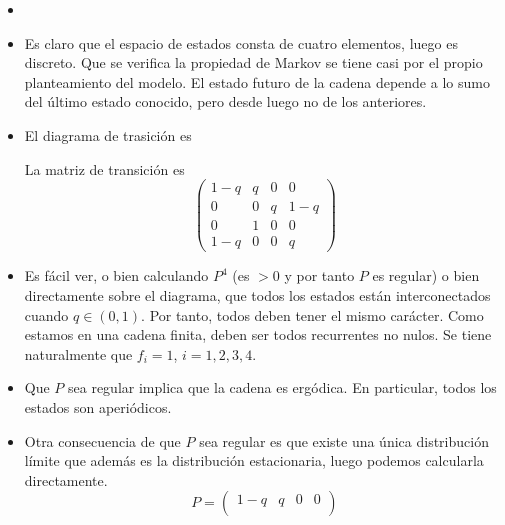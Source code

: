 \documentclass[twoside]{article}
\begin{document}
\begin{solucion}

\begin{itemize}
\item[]
\item Es claro que el espacio de estados consta de cuatro elementos, luego es discreto. Que se verifica la propiedad de Markov se tiene casi por el propio planteamiento del modelo. El estado futuro de la cadena depende a lo sumo del último estado conocido, pero desde luego no de los anteriores. 
\item El diagrama de trasición es

\begin{center}
\end{center}
La matriz de transición es
$$
\begin{pmatrix}
1-q	& q & 0 & 0\\
0 	& 0	& q	& 1-q\\
0	& 1 & 0 & 0\\
1-q & 0 & 0 & q
\end{pmatrix}
$$
\item Es fácil ver, o bien calculando $P^4$ (es $>0$ y por tanto $P$ es regular) o bien directamente sobre el diagrama, que todos los estados están interconectados cuando $q\in(0,1)$. Por tanto, todos deben tener el mismo carácter. Como estamos en una cadena finita, deben ser todos recurrentes no nulos. Se tiene naturalmente que $f_i = 1$, $i=1,2,3,4$.
\item Que $P$ sea regular implica que la cadena es ergódica. En particular, todos los estados son aperiódicos.
\item Otra consecuencia de que $P$ sea regular es que existe una única distribución límite que además es la distribución estacionaria, luego podemos calcularla directamente.
$$
P =\begin{pmatrix}
1-q	& q & 0 & 0\\

\end{pmatrix}$$
\end{itemize}
\end{solucion}
\end{document}
